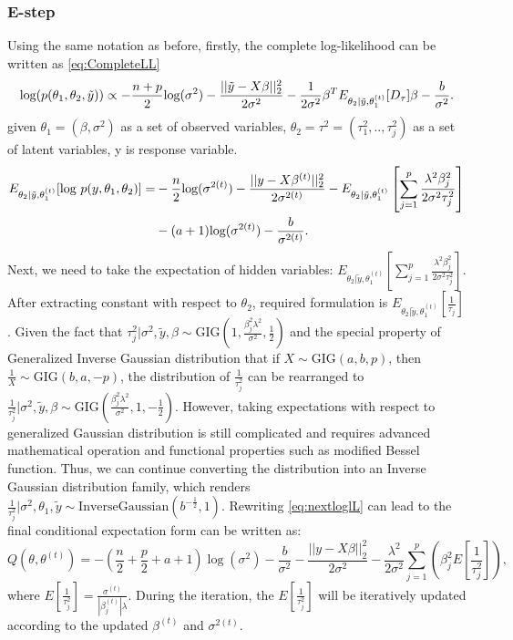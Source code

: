 \subsubsection{E-step}
Using the same notation as before, firstly, the complete log-likelihood can be written as \autoref{eq:CompleteLL}
\begin{equation}
	\label{eq:CompleteLL}
	\textnormal{log}(p(\theta_1,\theta_2,\tilde{y})) \propto -\frac{n+p}{2}\textnormal{log}(\sigma^2) - \frac{||\tilde{y}-X\beta||_2^2}{2\sigma^2} - \frac{1}{2\sigma^2}\beta^TE_{\theta_2|\tilde{y},\theta_1^{(t)}}[D_{\tau}]\beta - \frac{b}{\sigma^2}.
\end{equation}
given $\theta_1 = (\beta,\sigma^2)$ as a set of observed variables, $\theta_2 = \tau^2 = (\tau_1^2,..,\tau_j^2)$ as a set of latent variables, y is response variable.
\begin{equation}
    \begin{split}
    E_{\theta_2|\tilde{y},\theta_1^{(t)}}[\textnormal{log } p(y,\theta_1,\theta_2)] = & -\frac{n}{2} \textnormal{log}(\sigma^{2(t)})  - \frac{||y-X\beta^{(t)}||_2^2}{2\sigma^{2(t)}} - E_{\theta_2 |\tilde{y},\theta_1^{(t)}}\left[\sum_{j=1}^p \frac{\lambda^2\beta_j^2}{2\sigma^2\tau_j^2}\right] \\
    & -(a+1)\textnormal{log}(\sigma^{2(t)}) - \frac{b}{\sigma^{2(t)}}.
    \end{split}
    \label{eq:nextloglL}
\end{equation}
Next, we need to take the expectation of hidden variables: $E_{\theta_2 |\tilde{y},\theta_1^{(t)}}[\sum_{j=1}^p \frac{\lambda^2\beta_j^2}{2\sigma^2\tau_j^2}]$. After extracting constant with respect to $\theta_2$, required formulation is $E_{\theta_2 |\tilde{y},\theta_1^{(t)}}[\frac{1}{\tau_j}]$. Given the fact that $\tau_j^2|\sigma^2,\tilde{y},\beta \sim \text{GIG}(1,\frac{\beta_j^2\lambda^2}{\sigma^2},\frac{1}{2})$ and the special property of Generalized Inverse Gaussian distribution that if $X \sim \text{GIG}(a,b,p)$, then $\frac{1}{X} \sim \text{GIG}(b, a,-p)$, the distribution of $\frac{1}{\tau_j^2}$ can be rearranged to  $\frac{1}{\tau_j^2}|\sigma^2,\tilde{y},\beta \sim \text{GIG}(\frac{\beta_j^2\lambda^2}{\sigma^2},1,-\frac{1}{2})$.
However, taking expectations with respect to generalized Gaussian distribution is still complicated and requires advanced mathematical operation and functional properties such as modified Bessel function. Thus, we can continue converting the distribution into an Inverse Gaussian distribution family, which renders $\frac{1}{\tau_j^2}|\sigma^2,\theta_1,\tilde{y} \sim \text{InverseGaussian}(b^{-\frac{1}{2}},1)$. Rewriting \autoref{eq:nextloglL} can lead to the final conditional expectation form can be written as:
\begin{equation}
	Q(\theta,\theta^{(t)}) = -\left(\frac{n}{2}+\frac{p}{2}+a+1\right)\log(\sigma^2)-\frac{b}{\sigma^2}-\frac{||y-X\beta||_2^2}{2\sigma^2}-\frac{\lambda^2}{2\sigma^2}\sum_{j=1}^{p}\left(\beta_j^2 E\left[\frac{1}{\tau_j^2}\right]\right),
\end{equation}
where $	E\left[\frac{1}{\tau_j^2}\right] = \frac{\sigma^{(t)}}{|\beta_j^{(t)}|\lambda}$. During the iteration, the $E\left[\frac{1}{\tau_j^2}\right]$ will be iteratively updated according to the updated $\beta^{(t)}$ and $\sigma^{2(t)}$.
